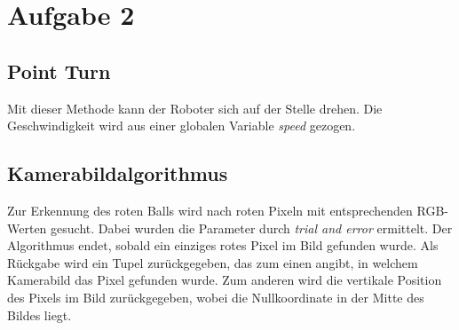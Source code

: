 \documentclass{../Vorlage/mat}
\begin{document}
\section*{Aufgabe 2}

\subsection*{Point Turn}
Mit dieser Methode kann der Roboter sich auf der Stelle drehen. Die Geschwindigkeit wird aus einer globalen Variable \textit{speed} gezogen.


\subsection*{Kamerabildalgorithmus}
Zur Erkennung des roten Balls wird nach roten Pixeln mit entsprechenden RGB-Werten gesucht. Dabei wurden die Parameter durch \textit{trial and error} ermittelt. Der Algorithmus endet, sobald ein einziges rotes Pixel im Bild gefunden wurde. Als Rückgabe wird ein Tupel zurückgegeben, das zum einen angibt, in welchem Kamerabild das Pixel gefunden wurde. Zum anderen wird die vertikale Position des Pixels im Bild zurückgegeben, wobei die Nullkoordinate in der Mitte des Bildes liegt.

\end{document}
